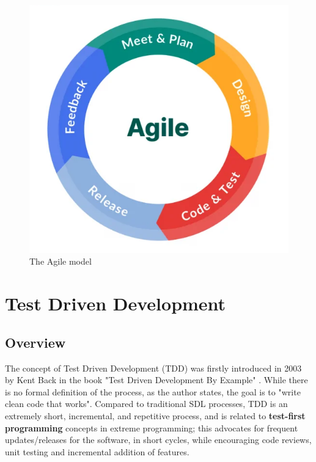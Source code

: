 \begin{figure}[h]
    \centering
    \includegraphics[width=\linewidth]{figures/agile_model.jpg}
    \caption{The Agile model}
    \label{agile_model}
\end{figure}



\section{Test Driven Development}

\subsection{Overview}
The concept of Test Driven Development (TDD) was firstly introduced in 2003 by Kent Back in the book "Test Driven Development By Example" \cite{TDDByExample}. While there is no formal definition of the process, as the author states, the goal is to "write clean code that works".
Compared to traditional SDL processes, TDD is an extremely short, incremental, and repetitive process, and is related to \textbf{test-first programming} concepts in extreme programming; this advocates for frequent updates/releases for the software, in short cycles, while encouraging code reviews, unit testing and incremental addition of features.


